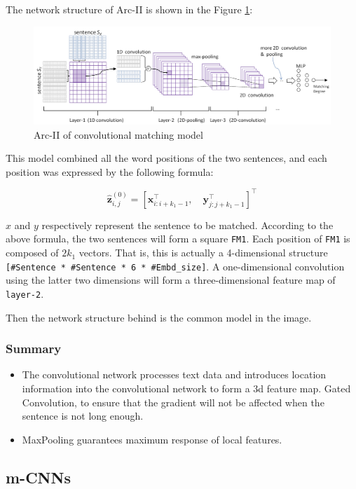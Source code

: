 The network structure of Arc-II is shown in the Figure \ref{fig:cnnamnls3}:

\begin{figure}[h!]
\centering
\includegraphics[width=\textwidth]{cnnamnls3.pdf}
\caption{Arc-II of convolutional matching model \cite{hu2015convolutional}}
\label{fig:cnnamnls3}
\end{figure}

This model combined all the word positions of the two sentences, and each position was expressed by the following formula:

$$
\hat{\mathbf{z}}_{i, j}^{(0)}=\left[\mathbf{x}_{i: i+k_{1}-1}^{\top}, \quad \mathbf{y}_{j: j+k_{1}-1}^{\top}\right]^{\top}
$$

$x$ and $y$ respectively represent the sentence to be matched. According to the above formula, the two sentences will form a square \verb|FM1|. Each position of \verb|FM1| is composed of $2k_1$ vectors. That is, this is actually a 4-dimensional structure \verb|[#Sentence * #Sentence * 6 * #Embd_size]|. A one-dimensional convolution using the latter two dimensions will form a three-dimensional feature map of \verb|layer-2|.

Then the network structure behind is the common model in the image.

\subsubsection{Summary}
\begin{itemize}
    \item The convolutional network processes text data and introduces location information into the convolutional network to form a 3d feature map. Gated Convolution, to ensure that the gradient will not be affected when the sentence is not long enough.
    \item MaxPooling guarantees maximum response of local features.
\end{itemize}

\subsection{m-CNNs}

